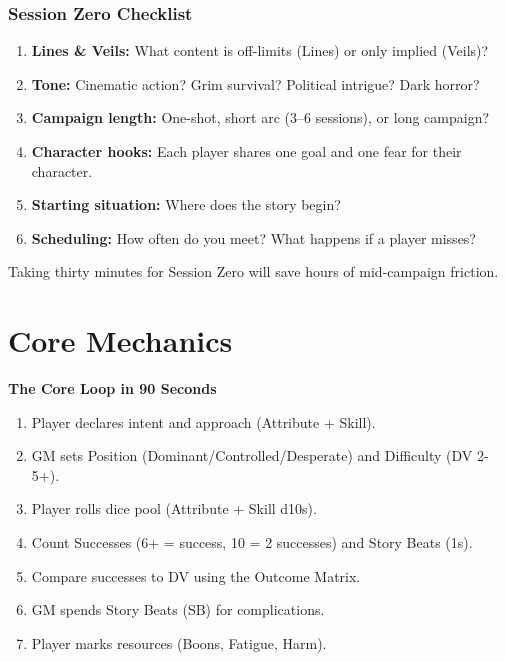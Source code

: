 \documentclass[11pt]{book}
\begin{document}
\subsection*{Session Zero Checklist}
\begin{enumerate}
  \item \textbf{Lines \& Veils:} What content is off-limits (Lines) or only implied (Veils)?
  \item \textbf{Tone:} Cinematic action? Grim survival? Political intrigue? Dark horror?
  \item \textbf{Campaign length:} One-shot, short arc (3--6 sessions), or long campaign?
  \item \textbf{Character hooks:} Each player shares one goal and one fear for their character.
  \item \textbf{Starting situation:} Where does the story begin?
  \item \textbf{Scheduling:} How often do you meet? What happens if a player misses?
\end{enumerate}

Taking thirty minutes for Session Zero will save hours of mid-campaign friction.

\clearpage

\chapter{Core Mechanics}
\label{ch:core-mechanics}

\begin{rulesummary}
\textbf{The Core Loop in 90 Seconds}
\begin{enumerate}
  \item Player declares intent and approach (Attribute + Skill).
  \item GM sets Position (Dominant/Controlled/Desperate) and Difficulty (DV 2-5+).
  \item Player rolls dice pool (Attribute + Skill d10s).
  \item Count Successes (6+ = success, 10 = 2 successes) and Story Beats (1s).
  \item Compare successes to DV using the Outcome Matrix.
  \item GM spends Story Beats (SB) for complications.
  \item Player marks resources (Boons, Fatigue, Harm).
\end{enumerate}
\end{rulesummary}
\end{document}
